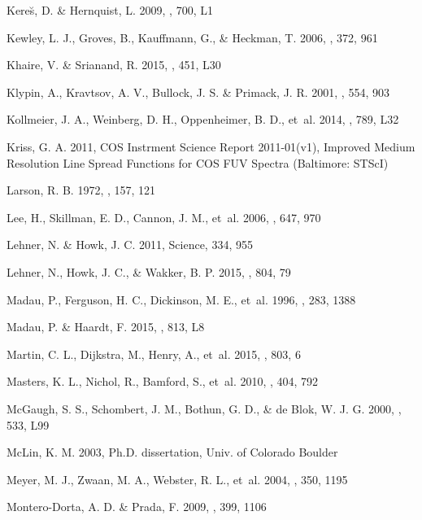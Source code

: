 \documentclass[twocolumn,twocolappendix,tighten,times]{aastex6}
\begin{document}
\begin{thebibliography}
 Kere\u{s}, D. \& Hernquist, L. 2009, \apjl, 700, L1

 Kewley, L. J., Groves, B., Kauffmann, G., \& Heckman, T. 2006, \mnras, 372, 961

 Khaire, V. \& Srianand, R. 2015, \mnras, 451, L30

 Klypin, A., Kravtsov, A. V., Bullock, J. S. \& Primack, J. R. 2001, \apj, 554, 903

 Kollmeier, J. A., Weinberg, D. H., Oppenheimer, B. D., et~al. 2014, \apj, 789, L32

 Kriss, G. A. 2011, COS Instrment Science Report 2011-01(v1), Improved Medium Resolution Line Spread Functions for COS FUV Spectra (Baltimore: STScI)

 Larson, R. B. 1972, \mnras, 157, 121

 Lee, H., Skillman, E. D., Cannon, J. M., et~al. 2006, \apj, 647, 970

 Lehner, N. \& Howk, J. C. 2011, Science, 334, 955

 Lehner, N., Howk, J. C., \& Wakker, B. P. 2015, \apj, 804, 79 

 Madau, P., Ferguson, H. C., Dickinson, M. E., et~al. 1996, \mnras, 283, 1388

 Madau, P. \& Haardt, F. 2015, \apj, 813, L8

 Martin, C. L., Dijkstra, M., Henry, A., et~al. 2015, \apj, 803, 6

 Masters, K. L., Nichol, R., Bamford, S., et~al. 2010, \mnras, 404, 792

 McGaugh, S. S., Schombert, J. M., Bothun, G. D., \& de Blok, W. J. G. 2000, \apjl, 533, L99

 McLin, K. M. 2003, Ph.D. dissertation, Univ. of Colorado Boulder

 Meyer, M. J., Zwaan, M. A., Webster, R. L., et~al. 2004, \mnras, 350, 1195

 Montero-Dorta, A. D. \& Prada, F. 2009, \mnras, 399, 1106


\end{thebibliography}
\end{document}
